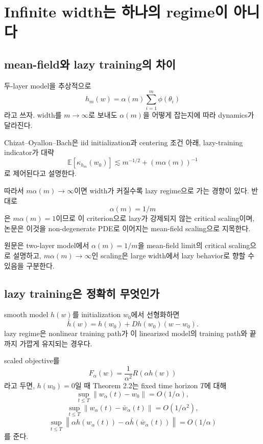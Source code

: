 \documentclass[11pt,a4paper,oneside,openany]{memoir}
\newcommand{\E}{\mathbb{E}}
\newcommand{\norm}[1]{\left\lVert #1\right\rVert}
\theoremstyle{definition}
\begin{document}
\chapter{Infinite width는 하나의 regime이 아니다}

\section{mean-field와 lazy training의 차이}

두-layer model을 추상적으로
\begin{equation}
  h_m(w)=\alpha(m)\sum_{i=1}^{m}\phi(\theta_i)
\label{eq:alpha-scaling}
\end{equation}
라고 쓰자. width를 $m\to\infty$로 보내도 $\alpha(m)$을 어떻게 잡는지에 따라 dynamics가 달라진다.

Chizat--Oyallon--Bach은 iid initialization과 centering 조건 아래, lazy-training indicator가 대략
\begin{equation}
  \E[\kappa_{h_m}(w_0)]
  \lesssim m^{-1/2}+(m\alpha(m))^{-1}
\label{eq:lazy-indicator}
\end{equation}
로 제어된다고 설명한다.

따라서 $m\alpha(m)\to\infty$이면 width가 커질수록 lazy regime으로 가는 경향이 있다.
반대로
\[
  \boxed{\alpha(m)=1/m}
\]
은 $m\alpha(m)=1$이므로 이 criterion으로 lazy가 강제되지 않는 critical scaling이며,
논문은 이것을 non-degenerate PDE로 이어지는 mean-field scaling으로 지목한다.

\begin{paperbox}
원문은 two-layer model에서 $\alpha(m)=1/m$을 mean-field limit의 critical scaling으로 설명하고,
$m\alpha(m)\to\infty$인 scaling은 large width에서 lazy behavior로 향할 수 있음을 구분한다.
\end{paperbox}

\section{lazy training은 정확히 무엇인가}

smooth model $h(w)$를 initialization $w_0$에서 선형화하면
\[
  \bar h(w)=h(w_0)+Dh(w_0)(w-w_0).
\]
lazy regime은 nonlinear training path가 이 linearized model의 training path와 끝까지 가깝게 유지되는 경우다.

scaled objective를
\[
  F_\alpha(w)=\frac1{\alpha^2}R(\alpha h(w))
\]
라고 두면, $h(w_0)=0$일 때 Theorem 2.2는 fixed time horizon $T$에 대해
\[
  \sup_{t\le T}\norm{w_\alpha(t)-w_0}=O(1/\alpha),
\]
\[
  \sup_{t\le T}\norm{w_\alpha(t)-\bar w_\alpha(t)}=O(1/\alpha^2),
\]
\[
  \sup_{t\le T}
  \norm{\alpha h(w_\alpha(t))-\alpha\bar h(\bar w_\alpha(t))}
  =O(1/\alpha)
\]
를 준다.
\end{document}
